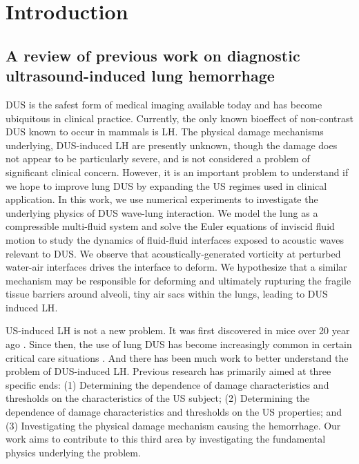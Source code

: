 \section{Introduction}
\label{sec:usbe_lung_introduction}
\subsection{A review of previous work on diagnostic ultrasound-induced lung hemorrhage}
\label{subsec:usbe_lung_bio_intro}
\ac{DUS} is the safest form of medical imaging available today and has
become ubiquitous in clinical practice. Currently, the only known
bioeffect of non-contrast \ac{DUS} known to occur in mammals is
\ac{LH}. The physical damage mechanisms underlying, \ac{DUS}-induced
\ac{LH} are presently unknown, though the damage does not appear to be
particularly severe, and is not considered a problem of significant
clinical concern. However, it is an important problem to understand if
we hope to improve lung \ac{DUS} by expanding the US regimes used in
clinical application. In this work, we use numerical experiments to
investigate the underlying physics of \ac{DUS} wave-lung
interaction. We model the lung as a compressible multi-fluid system
and solve the Euler equations of inviscid fluid motion to study the
dynamics of fluid-fluid interfaces exposed to acoustic waves relevant
to \ac{DUS}. We observe that acoustically-generated vorticity at
perturbed water-air interfaces drives the interface to deform. We
hypothesize that a similar mechanism may be responsible for deforming
and ultimately rupturing the fragile tissue barriers around alveoli,
tiny air sacs within the lungs, leading to \ac{DUS} induced \ac{LH}.

\ac{US}-induced \ac{LH} is not a new problem. It was first discovered
in mice over 20 year ago \citep{Child1990}. Since then, the use of
lung \ac{DUS} has become increasingly common in certain critical care
situations \citep{Lichtenstein2009}. And there has been much work to
better understand the problem of \ac{DUS}-induced \ac{LH}. Previous
research has primarily aimed at three specific ends: (1) Determining
the dependence of damage characteristics and thresholds on the
characteristics of the \ac{US} subject; (2) Determining the dependence
of damage characteristics and thresholds on the \ac{US} properties;
and (3) Investigating the physical damage mechanism causing the
hemorrhage.  Our work aims to contribute to this third area by
investigating the fundamental physics underlying the problem.


